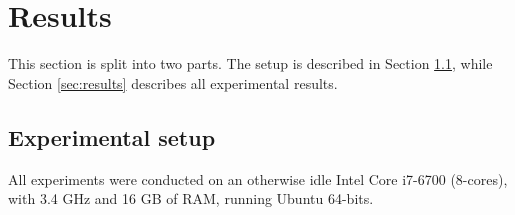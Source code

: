 \documentclass[journal]{IEEEtran}
\begin{document}
%




\section{Results}

This section is split into two parts. The setup is described in Section \ref{sec:setup}, while Section \ref{sec:results} describes all experimental results.


\subsection{Experimental setup}
\label{sec:setup}
All experiments were conducted on an otherwise idle Intel Core i7-6700 (8-cores), with 3.4 GHz and 16 GB of RAM, running Ubuntu 64-bits.
\end{document}
